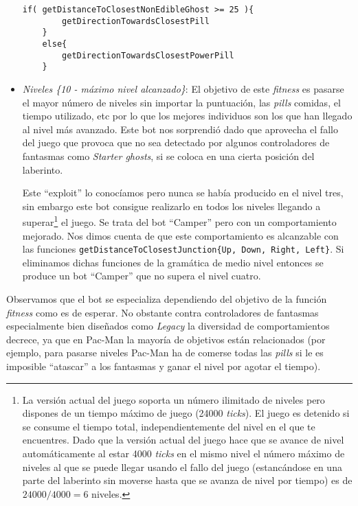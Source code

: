 \begin{itemize}
\begin{lstlisting}[frame=single, breaklines=no, basicstyle=\fontsize{10}{11}\ttfamily, caption=Mejor individuo obtenido mediante esta función fitness.]
    if( getDistanceToClosestNonEdibleGhost >= 25 ){ 
        getDirectionTowardsClosestPill
    }
    else{ 
        getDirectionTowardsClosestPowerPill
    }
\end{lstlisting}

\item \textit{Niveles \{10 - máximo nivel alcanzado\}}: El objetivo de este \textit{fitness} es pasarse el mayor número de niveles sin importar la puntuación, las \textit{pills} comidas, el tiempo utilizado, etc por lo que los mejores individuos son los que han llegado al nivel más avanzado. Este bot nos sorprendió dado que aprovecha el fallo del juego que provoca que no sea detectado por algunos controladores de fantasmas como \textit{Starter ghosts}, si se coloca en una cierta posición del laberinto.

Este ``exploit'' lo conocíamos pero nunca se había producido en el nivel tres, sin embargo este bot consigue realizarlo en todos los niveles llegando a superar\footnote{La versión actual del juego soporta un número ilimitado de niveles pero dispones de un tiempo máximo de juego (24000 \textit{ticks}). El juego es detenido si se consume el tiempo total, independientemente del nivel en el que te encuentres. Dado que la versión actual del juego hace que se avance de nivel automáticamente al estar 4000 \textit{ticks} en el mismo nivel el número máximo de niveles al que se puede llegar usando el fallo del juego (estancándose en una parte del laberinto sin moverse hasta que se avanza de nivel por tiempo) es de $24000 / 4000 = 6$ niveles.} el juego. Se trata del bot ``Camper'' pero con un comportamiento mejorado. Nos dimos cuenta de que este comportamiento es alcanzable con las funciones \texttt{getDistanceToClosestJunction\{Up, Down, Right, Left\}}. Si eliminamos dichas funciones de la gramática de medio nivel entonces se produce un bot ``Camper'' que no supera el nivel cuatro.
\end{itemize}

Observamos que el bot se especializa dependiendo del objetivo de la función \textit{fitness} como es de esperar. No obstante contra controladores de fantasmas especialmente bien diseñados como \textit{Legacy} la diversidad de comportamientos decrece, ya que en Pac-Man la mayoría de objetivos están relacionados (por ejemplo, para pasarse niveles Pac-Man ha de comerse todas las \textit{pills} si le es imposible ``atascar'' a los fantasmas y ganar el nivel por agotar el tiempo).

